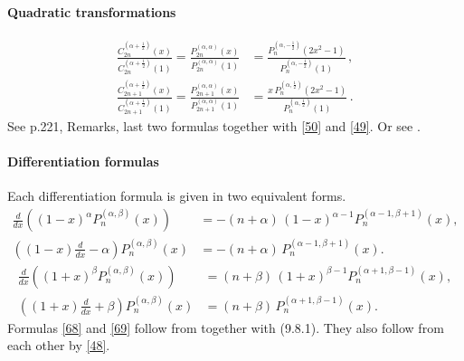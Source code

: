 \documentclass[twoside,11pt]{article}
\newcommand\al\alpha
\newcommand\be\beta
\newcommand\half{\frac12}
\begin{document}
\paragraph{Quadratic transformations}
\begin{align}
\frac{C_{2n}^{(\al+\half)}(x)}{C_{2n}^{(\al+\half)}(1)}
=\frac{P_{2n}^{(\al,\al)}(x)}{P_{2n}^{(\al,\al)}(1)}
&=\frac{P_n^{(\al,-\half)}(2x^2-1)}{P_n^{(\al,-\half)}(1)}\,,
\label{51}\\
\frac{C_{2n+1}^{(\al+\half)}(x)}{C_{2n+1}^{(\al+\half)}(1)}
=\frac{P_{2n+1}^{(\al,\al)}(x)}{P_{2n+1}^{(\al,\al)}(1)}
&=\frac{x\,P_n^{(\al,\half)}(2x^2-1)}{P_n^{(\al,\half)}(1)}\,.
\label{52}
\end{align}
See p.221, Remarks, last two formulas together with \eqref{50} and \eqref{49}.
Or see \cite[(18.7.13), (18.7.14)]{DLMF}.
%
\paragraph{Differentiation formulas}
Each differentiation formula is given in two equivalent forms.
\begin{equation}
\begin{split}
\frac d{dx}\left((1-x)^\al P_n^{(\al,\be)}(x)\right)&=
-(n+\al)\,(1-x)^{\al-1} P_n^{(\al-1,\be+1)}(x),\\
\left((1-x)\frac d{dx}-\al\right)P_n^{(\al,\be)}(x)&=
-(n+\al)\,P_n^{(\al-1,\be+1)}(x).
\end{split}
\label{68}
\end{equation}
%
\begin{equation}
\begin{split}
\frac d{dx}\left((1+x)^\be P_n^{(\al,\be)}(x)\right)&=
(n+\be)\,(1+x)^{\be-1} P_n^{(\al+1,\be-1)}(x),\\
\left((1+x)\frac d{dx}+\be\right)P_n^{(\al,\be)}(x)&=
(n+\be)\,P_n^{(\al+1,\be-1)}(x).
\end{split}
\label{69}
\end{equation}
Formulas \eqref{68} and \eqref{69} follow from \cite[(15.5.4), (15.5.6)]{DLMF}
together with (9.8.1). They also follow from each other by \eqref{48}.
%
\end{document}
